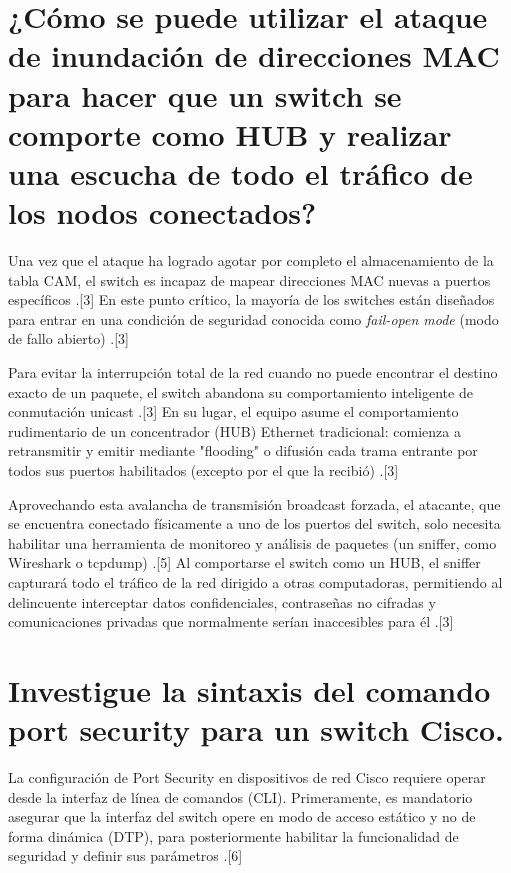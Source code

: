 \documentclass[a4paper,12pt]{article}
\begin{document}
\newpage

\section{¿Cómo se puede utilizar el ataque de inundación de direcciones MAC para hacer que un switch se comporte como HUB y realizar una escucha de todo el tráfico de los nodos conectados?}

Una vez que el ataque ha logrado agotar por completo el almacenamiento de la tabla CAM, el switch es incapaz de mapear direcciones MAC nuevas a puertos específicos \cite{jumpcloud_mac}.[3] En este punto crítico, la mayoría de los switches están diseñados para entrar en una condición de seguridad conocida como \textit{fail-open mode} (modo de fallo abierto) \cite{jumpcloud_mac}.[3]

Para evitar la interrupción total de la red cuando no puede encontrar el destino exacto de un paquete, el switch abandona su comportamiento inteligente de conmutación unicast \cite{jumpcloud_mac}.[3] En su lugar, el equipo asume el comportamiento rudimentario de un concentrador (HUB) Ethernet tradicional: comienza a retransmitir y emitir mediante "flooding" o difusión cada trama entrante por todos sus puertos habilitados (excepto por el que la recibió) \cite{jumpcloud_mac}.[3] 

Aprovechando esta avalancha de transmisión broadcast forzada, el atacante, que se encuentra conectado físicamente a uno de los puertos del switch, solo necesita habilitar una herramienta de monitoreo y análisis de paquetes (un sniffer, como Wireshark o tcpdump) \cite{huntress_mac}.[5] Al comportarse el switch como un HUB, el sniffer capturará todo el tráfico de la red dirigido a otras computadoras, permitiendo al delincuente interceptar datos confidenciales, contraseñas no cifradas y comunicaciones privadas que normalmente serían inaccesibles para él \cite{jumpcloud_mac}.[3]

\newpage

\section{Investigue la sintaxis del comando port security para un switch Cisco.}

La configuración de Port Security en dispositivos de red Cisco requiere operar desde la interfaz de línea de comandos (CLI). Primeramente, es mandatorio asegurar que la interfaz del switch opere en modo de acceso estático y no de forma dinámica (DTP), para posteriormente habilitar la funcionalidad de seguridad y definir sus parámetros \cite{compnet_portsec}.[6] 
\end{document}
